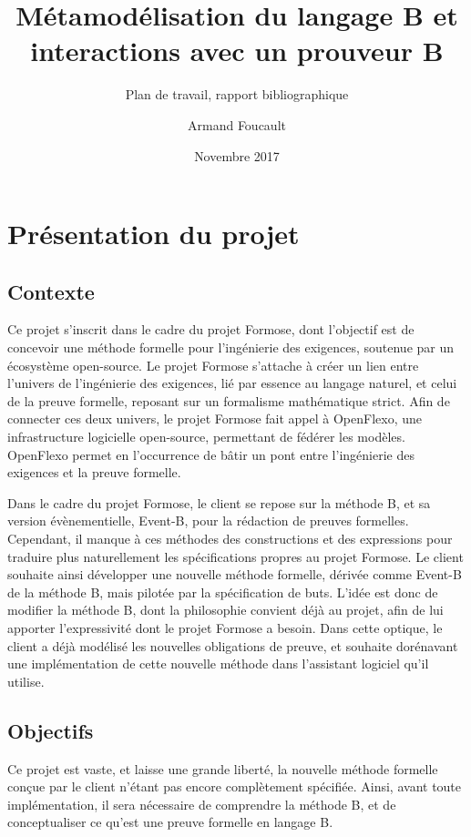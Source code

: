 \documentclass{article}
\author{Armand Foucault}
\date{Novembre 2017}
\title{Métamodélisation du langage B et \mbox{interactions} avec un prouveur B}
\subtitle{Plan de travail, rapport bibliographique}
\begin{document}
\imtaMaketitlepage

\tableofcontents

\newpage


\section{Présentation du projet}

\subsection{Contexte}

Ce projet s'inscrit dans le cadre du projet Formose, dont l'objectif est de concevoir une méthode formelle pour l'ingénierie %
des exigences, soutenue par un écosystème open-source.
Le projet Formose s'attache à créer un lien entre l'univers de l'ingénierie des exigences, lié par essence au langage naturel, %
et celui de la preuve formelle, reposant sur un formalisme mathématique strict.
Afin de connecter ces deux univers, le projet Formose fait appel à OpenFlexo, une infrastructure logicielle open-source, permettant de fédérer les modèles.
OpenFlexo permet en l'occurrence de bâtir un pont entre l'ingénierie des exigences et la preuve formelle.

Dans le cadre du projet Formose, le client se repose sur la méthode B, et sa version évènementielle, Event-B, pour la rédaction de preuves formelles.
Cependant, il manque à ces méthodes des constructions et des expressions pour traduire plus naturellement les spécifications propres au projet Formose.
Le client souhaite ainsi développer une nouvelle méthode formelle, dérivée comme Event-B de la méthode B, mais pilotée par la spécification de buts.
L'idée est donc de modifier la méthode B, dont la philosophie convient déjà au projet, afin de lui apporter l'expressivité dont le projet Formose a besoin.
Dans cette optique, le client a déjà modélisé les nouvelles obligations de preuve, et souhaite dorénavant une implémentation de cette nouvelle méthode dans l'assistant logiciel qu'il utilise.

\subsection{Objectifs}

Ce projet est vaste, et laisse une grande liberté, la nouvelle méthode formelle conçue par le client n'étant pas encore complètement spécifiée.
Ainsi, avant toute implémentation, il sera nécessaire de comprendre la méthode B, et de conceptualiser ce qu'est une preuve formelle en langage B.
\end{document}
